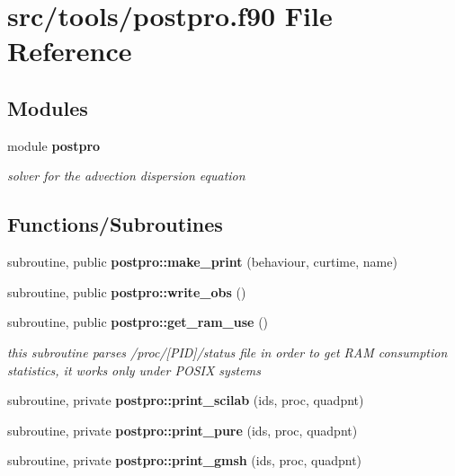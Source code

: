 \section{src/tools/postpro.f90 File Reference}
\label{postpro_8f90}
\subsection*{Modules}
\begin{DoxyCompactItemize}
\item 
module {\bf postpro}
\begin{DoxyCompactList}\small\item\em solver for the advection dispersion equation \end{DoxyCompactList}\end{DoxyCompactItemize}
\subsection*{Functions/\+Subroutines}
\begin{DoxyCompactItemize}
\item 
subroutine, public {\bf postpro\+::make\+\_\+print} (behaviour, curtime, name)
\item 
subroutine, public {\bf postpro\+::write\+\_\+obs} ()
\item 
subroutine, public {\bf postpro\+::get\+\_\+ram\+\_\+use} ()
\begin{DoxyCompactList}\small\item\em this subroutine parses /proc/[P\+ID]/status file in order to get R\+AM consumption statistics, it works only under P\+O\+S\+IX systems \end{DoxyCompactList}\item 
subroutine, private {\bf postpro\+::print\+\_\+scilab} (ids, proc, quadpnt)
\item 
subroutine, private {\bf postpro\+::print\+\_\+pure} (ids, proc, quadpnt)
\item 
subroutine, private {\bf postpro\+::print\+\_\+gmsh} (ids, proc, quadpnt)
\end{DoxyCompactItemize}
